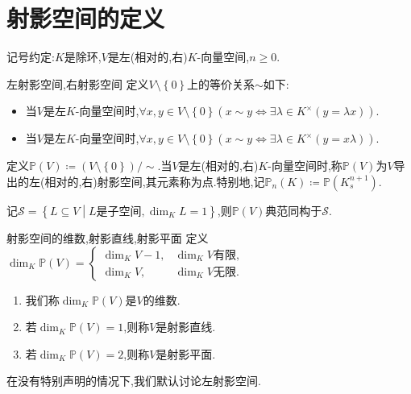 \section{射影空间的定义}

记号约定:$K$是除环,$V$是左(相对的,右)$K$-向量空间,$n\geq 0$.

\begin{definition}{左射影空间,右射影空间}{}
	定义$V\setminus\left\{0\right\}$上的等价关系$\sim$如下:
	\begin{itemize}
		\item 当$V$是左$K$-向量空间时,$\forall x,y\in V\setminus\left\{0\right\}\left(x\sim y\iff\exists \lambda\in K^{\times}\left(y=\lambda x\right)\right)$.
		\item 当$V$是左$K$-向量空间时,$\forall x,y\in V\setminus\left\{0\right\}\left(x\sim y\iff\exists \lambda\in K^{\times}\left(y=x\lambda \right)\right)$.
	\end{itemize}
	定义$\mathbb{P}\left(V\right)\coloneq\left(V\setminus\left\{0\right\}\right)/\sim$.当$V$是左(相对的,右)$K$-向量空间时,称$\mathbb{P}\left(V\right)$为$V$导出的左(相对的,右)射影空间,其元素称为点.特别地,记$\mathbb{P}_{n}\left(K\right)\coloneq\mathbb{P}\left(K_{s}^{n+1}\right)$.
\end{definition}

\begin{remark}{}{}
	记$\mathcal{S}=\left\{L\subseteq V\middle|L\text{是子空间},\dim_{K}L=1\right\}$,则$\mathbb{P}\left(V\right)$典范同构于$\mathcal{S}$.
\end{remark}

\begin{definition}{射影空间的维数,射影直线,射影平面}{}
	定义$\dim_{K}\mathbb{P}\left(V\right)=
	\begin{cases}
		\dim_{K}V-1,&\dim_{K}V\text{有限},\\
		\dim_{K}V,&\dim_{K}V\text{无限}.
	\end{cases}$
	\begin{enumerate}
		\item 我们称$\dim_{K}\mathbb{P}\left(V\right)$是$V$的维数.
		\item 若$\dim_{K}\mathbb{P}\left(V\right)=1$,则称$V$是射影直线.
		\item 若$\dim_{K}\mathbb{P}\left(V\right)=2$,则称$V$是射影平面.
	\end{enumerate}
\end{definition}

\begin{convention}{}{}
	在没有特别声明的情况下,我们默认讨论左射影空间.
\end{convention}









